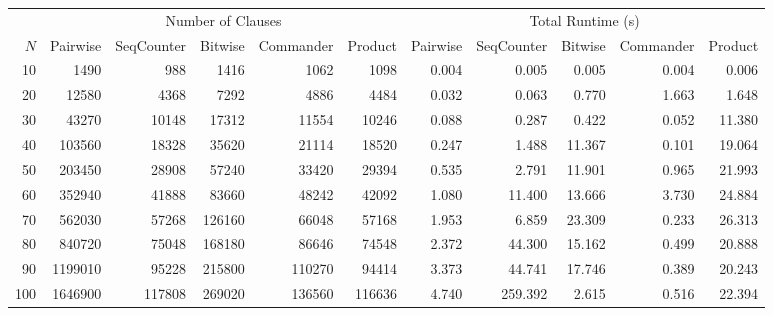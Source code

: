 \begin{tabular}{r|rrrrr|rrrrr}
\hline
 & \multicolumn{5}{c|}{Number of Clauses} & \multicolumn{5}{c}{Total Runtime (s)} \\
$N$ & Pairwise & SeqCounter & Bitwise & Commander & Product & Pairwise & SeqCounter & Bitwise & Commander & Product \\
\hline
 10 &      1490 &       988 &      1416 &      1062 &      1098 &    0.004 &    0.005 &    0.005 &    0.004 &    0.006 \\
 20 &     12580 &      4368 &      7292 &      4886 &      4484 &    0.032 &    0.063 &    0.770 &    1.663 &    1.648 \\
 30 &     43270 &     10148 &     17312 &     11554 &     10246 &    0.088 &    0.287 &    0.422 &    0.052 &   11.380 \\
 40 &    103560 &     18328 &     35620 &     21114 &     18520 &    0.247 &    1.488 &   11.367 &    0.101 &   19.064 \\
 50 &    203450 &     28908 &     57240 &     33420 &     29394 &    0.535 &    2.791 &   11.901 &    0.965 &   21.993 \\
 60 &    352940 &     41888 &     83660 &     48242 &     42092 &    1.080 &   11.400 &   13.666 &    3.730 &   24.884 \\
 70 &    562030 &     57268 &    126160 &     66048 &     57168 &    1.953 &    6.859 &   23.309 &    0.233 &   26.313 \\
 80 &    840720 &     75048 &    168180 &     86646 &     74548 &    2.372 &   44.300 &   15.162 &    0.499 &   20.888 \\
 90 &   1199010 &     95228 &    215800 &    110270 &     94414 &    3.373 &   44.741 &   17.746 &    0.389 &   20.243 \\
100 &   1646900 &    117808 &    269020 &    136560 &    116636 &    4.740 &  259.392 &    2.615 &    0.516 &   22.394 \\
\hline
\end{tabular}

